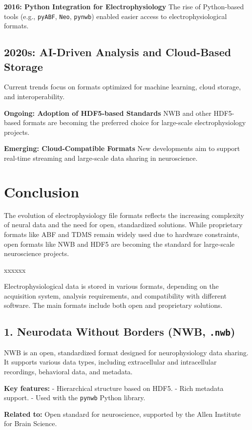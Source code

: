 \documentclass[a4paper,9pt]{extarticle}
\begin{document}
\begin{multicols}{2}
\textbf{2016: Python Integration for Electrophysiology}  
The rise of Python-based tools (e.g., \texttt{pyABF}, \texttt{Neo}, \texttt{pynwb}) enabled easier access to electrophysiological formats.

\subsection*{2020s: AI-Driven Analysis and Cloud-Based Storage}
Current trends focus on formats optimized for machine learning, cloud storage, and interoperability.

\textbf{Ongoing: Adoption of HDF5-based Standards}  
NWB and other HDF5-based formats are becoming the preferred choice for large-scale electrophysiology projects.

\textbf{Emerging: Cloud-Compatible Formats}  
New developments aim to support real-time streaming and large-scale data sharing in neuroscience.

\section*{Conclusion}
The evolution of electrophysiology file formats reflects the increasing complexity of neural data and the need for open, standardized solutions. While proprietary formats like ABF and TDMS remain widely used due to hardware constraints, open formats like NWB and HDF5 are becoming the standard for large-scale neuroscience projects.


xxxxxx


Electrophysiological data is stored in various formats, depending on the acquisition system, analysis requirements, and compatibility with different software. The main formats include both open and proprietary solutions.

\subsection*{1. Neurodata Without Borders (NWB, \texttt{.nwb})}
NWB is an open, standardized format designed for neurophysiology data sharing. It supports various data types, including extracellular and intracellular recordings, behavioral data, and metadata.

\textbf{Key features:}  
- Hierarchical structure based on HDF5.  
- Rich metadata support.  
- Used with the \texttt{pynwb} Python library.

\textbf{Related to:} Open standard for neuroscience, supported by the Allen Institute for Brain Science.


\end{multicols}
\end{document}
